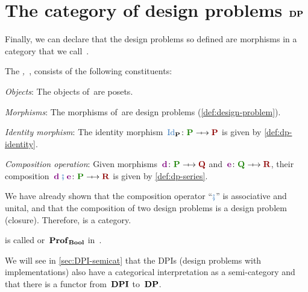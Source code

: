 
\section{The category of design problems $\mathbf{DP}$}

Finally, we can declare that the design problems so defined are morphisms in a category that we call~\iindex{\DP}.


\begin{definition}
    \label{def:DP}
    The \emph{,~\DP}, consists of the following constituents:
    \begin{compactenum}
        \item \emph{Objects}: The objects of~\DP are posets.
        \item \emph{Morphisms}: The morphisms of~\DP are design problems (\cref{def:design-problem}).
        \item \emph{Identity morphism}: The identity morphism~$\catid_\posgenA \colon \funposA \profto \resposA$ is given by \cref{def:dp-identity}.
        \item \emph{Composition operation}: Given morphisms~$\adpa \colon  \funposA \profto \resposB$ and~$\adpb \colon \funposB \profto \resposC$, their composition~$\adpa \mthen \adpb\colon \funposA\profto \resposC$ is given by \cref{def:dp-series}.
    \end{compactenum}
\end{definition}

We have already shown that the composition operator ``$\mthen$'' is associative and unital, and that the composition of two design problems is a design problem (closure).
Therefore, \DP is a category.

\begin{remark}
    \DP is called \feas or~$\mathbf{Prof}_\mathbf{Bool}$ in~\cite{fong2019}.
\end{remark}

\begin{remark}
    We will see in \cref{sec:DPI-semicat} that the DPIs (design problems with implementations) also have a categorical interpretation as a semi-category \DPI and that there is a functor from~$\mathbf{DPI}$ to~$\mathbf{DP}$.
\end{remark}
